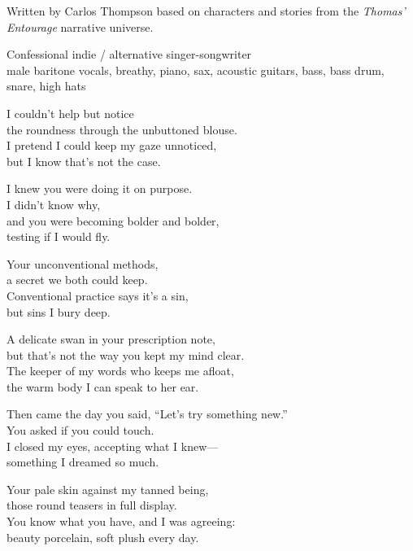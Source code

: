 
\label{sec:delicate-swan}
\begin{notes}
Written by Carlos Thompson based on characters and stories from the \emph{Thomas’ Entourage} narrative universe.
\end{notes}
\begin{style}
Confessional indie / alternative singer-songwriter\\
male baritone vocals, breathy, piano, sax, acoustic guitars, bass, bass drum, snare, high hats
\end{style}
\begin{lyrics}
I couldn’t help but notice\\
the roundness through the unbuttoned blouse.\\
I pretend I could keep my gaze unnoticed,\\
but I know that’s not the case.

I knew you were doing it on purpose.\\
I didn’t know why,\\
and you were becoming bolder and bolder,\\
testing if I would fly.

Your unconventional methods,\\
a secret we both could keep.\\
Conventional practice says it’s a sin,\\
but sins I bury deep.

A delicate swan in your prescription note,\\
but that’s not the way you kept my mind clear.\\
The keeper of my words who keeps me afloat,\\
the warm body I can speak to her ear.

Then came the day you said, “Let’s try something new.”\\
You asked if you could touch.\\
I closed my eyes, accepting what I knew—\\
something I dreamed so much.

Your pale skin against my tanned being,\\
those round teasers in full display.\\
You know what you have, and I was agreeing:\\
beauty porcelain, soft plush every day.


\end{lyrics}
